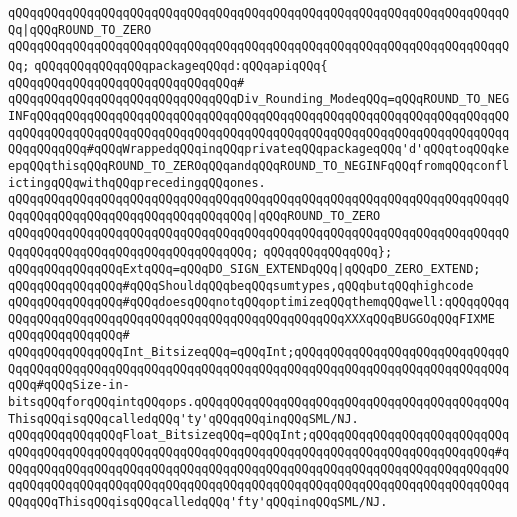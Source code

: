 \verb|qQQqqQQqqQQqqQQqqQQqqQQqqQQqqQQqqQQqqQQqqQQqqQQqqQQqqQQqqQQqqQQqqQQqqQQq|\verb#|qQQqROUND_TO_ZERO#\newline
\verb|qQQqqQQqqQQqqQQqqQQqqQQqqQQqqQQqqQQqqQQqqQQqqQQqqQQqqQQqqQQqqQQqqQQqqQQq;|\newline
\newline
\verb|qQQqqQQqqQQqqQQqpackageqQQqd:qQQqapiqQQq{|\newline
\verb|qQQqqQQqqQQqqQQqqQQqqQQqqQQqqQQq#|\newline
\verb|qQQqqQQqqQQqqQQqqQQqqQQqqQQqqQQqDiv_Rounding_ModeqQQq=qQQqROUND_TO_NEGINFqQQqqQQqqQQqqQQqqQQqqQQqqQQqqQQqqQQqqQQqqQQqqQQqqQQqqQQqqQQqqQQqqQQqqQQqqQQqqQQqqQQqqQQqqQQqqQQqqQQqqQQqqQQqqQQqqQQqqQQqqQQqqQQqqQQqqQQqqQQqqQQqqQQq#qQQqWrappedqQQqinqQQqprivateqQQqpackageqQQq'd'qQQqtoqQQqkeepqQQqthisqQQqROUND_TO_ZEROqQQqandqQQqROUND_TO_NEGINFqQQqfromqQQqconflictingqQQqwithqQQqprecedingqQQqones.|\newline
\verb|qQQqqQQqqQQqqQQqqQQqqQQqqQQqqQQqqQQqqQQqqQQqqQQqqQQqqQQqqQQqqQQqqQQqqQQqqQQqqQQqqQQqqQQqqQQqqQQqqQQqqQQq|\verb#|qQQqROUND_TO_ZERO#\newline
\verb|qQQqqQQqqQQqqQQqqQQqqQQqqQQqqQQqqQQqqQQqqQQqqQQqqQQqqQQqqQQqqQQqqQQqqQQqqQQqqQQqqQQqqQQqqQQqqQQqqQQqqQQq;|\newline
\verb|qQQqqQQqqQQqqQQq};|\newline
\newline
\verb|qQQqqQQqqQQqqQQqExtqQQq=qQQqDO_SIGN_EXTENDqQQq|\verb#|qQQqDO_ZERO_EXTEND;#\newline
\newline
\verb|qQQqqQQqqQQqqQQq#qQQqShouldqQQqbeqQQqsumtypes,qQQqbutqQQqhighcode|\newline
\verb|qQQqqQQqqQQqqQQq#qQQqdoesqQQqnotqQQqoptimizeqQQqthemqQQqwell:qQQqqQQqqQQqqQQqqQQqqQQqqQQqqQQqqQQqqQQqqQQqqQQqqQQqqQQqXXXqQQqBUGGOqQQqFIXME|\newline
\verb|qQQqqQQqqQQqqQQq#|\newline
\verb|qQQqqQQqqQQqqQQqInt_BitsizeqQQq=qQQqInt;qQQqqQQqqQQqqQQqqQQqqQQqqQQqqQQqqQQqqQQqqQQqqQQqqQQqqQQqqQQqqQQqqQQqqQQqqQQqqQQqqQQqqQQqqQQqqQQqqQQqqQQq#qQQqSize-in-bitsqQQqforqQQqintqQQqops.qQQqqQQqqQQqqQQqqQQqqQQqqQQqqQQqqQQqqQQqqQQqThisqQQqisqQQqcalledqQQq'ty'qQQqqQQqinqQQqSML/NJ.|\newline
\verb|qQQqqQQqqQQqqQQqFloat_BitsizeqQQq=qQQqInt;qQQqqQQqqQQqqQQqqQQqqQQqqQQqqQQqqQQqqQQqqQQqqQQqqQQqqQQqqQQqqQQqqQQqqQQqqQQqqQQqqQQqqQQqqQQqqQQq#qQQqqQQqqQQqqQQqqQQqqQQqqQQqqQQqqQQqqQQqqQQqqQQqqQQqqQQqqQQqqQQqqQQqqQQqqQQqqQQqqQQqqQQqqQQqqQQqqQQqqQQqqQQqqQQqqQQqqQQqqQQqqQQqqQQqqQQqqQQqqQQqqQQqThisqQQqisqQQqcalledqQQq'fty'qQQqinqQQqSML/NJ.|\newline
